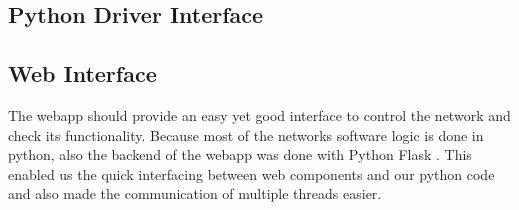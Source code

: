 \subsection{Python Driver Interface}

\subsection{Web Interface}

The webapp should provide an easy yet good interface to control the network and check its functionality. Because most of the networks software logic is done in python, also the backend of the webapp was done with Python Flask \cite{Pallets:2020aa}. This enabled us the quick interfacing between web components and our python code and also made the communication of multiple threads easier.






